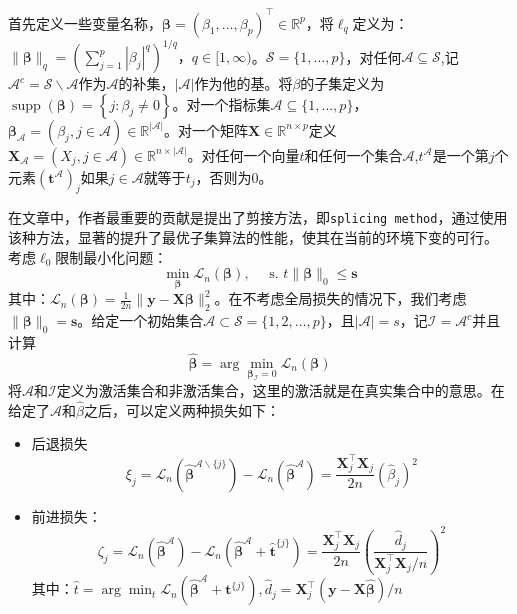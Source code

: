 \documentclass[
]{ctexart}
\newcommand{\passthrough}[1]{#1}
\begin{document}
首先定义一些变量名称，\(\boldsymbol{\beta}=\left(\beta_{1}, \ldots, \beta_{p}\right)^{\top} \in \mathbb{R}^{p}\)，将\(\ell_{q}\)定义为：\(\|\boldsymbol{\beta}\|_{q}=\left(\sum_{j=1}^{p}\left|\beta_{j}\right|^{q}\right)^{1 / q}，q \in[1, \infty)\)。\(\mathcal{S}=\{1, \ldots, p\}\)，对任何\(\mathcal{A} \subseteq \mathcal{S}\),记\(\mathcal{A}^{c}=\mathcal{S} \backslash \mathcal{A}\)作为\(\mathcal{A}\)的补集，\(|\mathcal{A}|\)作为他的基。将\(\beta\)的子集定义为\(\operatorname{supp}(\boldsymbol{\beta})=\left\{j: \beta_{j} \neq 0\right\}\)。对一个指标集\(\mathcal{A} \subseteq\{1, \ldots, p\}\)，\(\boldsymbol{\beta}_{\mathcal{A}}=\left(\beta_{j}, j \in \mathcal{A}\right) \in \mathbb{R}^{|\mathcal{A}|}\)。对一个矩阵\(\boldsymbol{X} \in \mathbb{R}^{n \times p}\)定义\(\boldsymbol{X}_{\mathcal{A}} =(X_{j},j \in \mathcal{A}) \in \mathbb{R}^{n \times|\mathcal{A}|}\)。对任何一个向量\(t\)和任何一个集合\(\mathcal{A}\),\(t^{\mathcal{A}}\)是一个第\(j\)个元素\(\left(\boldsymbol{t}^{\mathcal{A}}\right)_{j}\)如果\(j \in \mathcal{A}\)就等于\(t_{j}\)，否则为0。

在文章中，作者最重要的贡献是提出了剪接方法，即\passthrough{\lstinline!splicing method!}，通过使用该种方法，显著的提升了最优子集算法的性能，使其在当前的环境下变的可行。
考虑\(\ell_{0}\)限制最小化问题：\[
\min _{\boldsymbol{\beta}} \mathcal{L}_{n}(\boldsymbol{\beta}), \quad \text { s. } t\|\boldsymbol{\beta}\|_{0} \leq \boldsymbol{s}
\]
其中：\(\mathcal{L}_{n}(\boldsymbol{\beta})=\frac{1}{2 n}\|\boldsymbol{y}-\boldsymbol{X} \boldsymbol{\beta}\|_{2}^{2}\)。在不考虑全局损失的情况下，我们考虑\(\|\boldsymbol{\beta}\|_{0}=\boldsymbol{s}\)。给定一个初始集合\(\mathcal{A} \subset \mathcal{S}=\{1,2, \ldots, p\}\)，且\(|\mathcal{A}|=s\)，记\(\mathcal{I}=\mathcal{A}^{c}\)并且计算\[
\hat{\boldsymbol{\beta}}=\arg \min _{\boldsymbol{\beta}_{\mathcal{I}}=0} \mathcal{L}_{n}(\boldsymbol{\beta})
\]
将\(\mathcal{A}\)和\(\mathcal{I}\)定义为激活集合和非激活集合，这里的激活就是在真实集合中的意思。在给定了\(\mathcal{A}\)和\(\hat{\beta}\)之后，可以定义两种损失如下：

\begin{itemize}
\item
  后退损失\[
  \xi_{j}=\mathcal{L}_{n}\left(\hat{\boldsymbol{\beta}}^{\mathcal{A} \backslash\{j\}}\right)-\mathcal{L}_{n}\left(\hat{\boldsymbol{\beta}}^{\mathcal{A}}\right)=\frac{\boldsymbol{X}_{j}^{\top} \boldsymbol{X}_{j}}{2 n}\left(\hat{\beta}_{j}\right)^{2}
  \]
\item
  前进损失：\[
  \zeta_{j}=\mathcal{L}_{n}\left(\hat{\boldsymbol{\beta}}^{\mathcal{A}}\right)-\mathcal{L}_{n}\left(\hat{\boldsymbol{\beta}}^{\mathcal{A}}+\hat{\boldsymbol{t}}^{\{j\}}\right)=\frac{\boldsymbol{X}_{j}^{\top} \boldsymbol{X}_{j}}{2 n}\left(\frac{\hat{d}_{j}}{\boldsymbol{X}_{j}^{\top} \boldsymbol{X}_{j} / n}\right)^{2}
  \]
  其中：\(\hat{t}=\arg \min _{t} \mathcal{L}_{n}\left(\hat{\boldsymbol{\beta}}^{\mathcal{A}}+\boldsymbol{t}^{\{j\}}\right), \hat{d}_{j}=\boldsymbol{X}_{j}^{\top}(\boldsymbol{y}-\boldsymbol{X} \hat{\boldsymbol{\beta}}) / n\)
\end{itemize}
\end{document}
